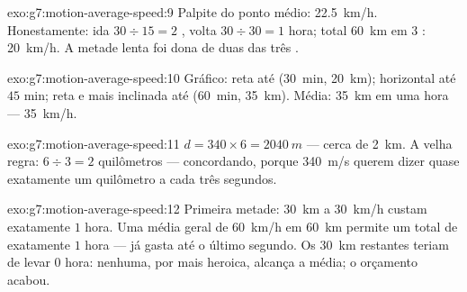 \begin{solution}{exo:g7:motion-average-speed:9}
Palpite do ponto médio: \qty{22.5}{km/h}. Honestamente: ida
$30 \div 15 = 2$ , volta $30 \div 30 = 1$ hora; total
\qty{60}{km} em $3$ : \qty{20}{km/h}. A metade lenta foi dona de
duas das três .
\end{solution}

\begin{solution}{exo:g7:motion-average-speed:10}
Gráfico: reta até (\qty{30}{min}, \qty{20}{km}); horizontal até $45$
min; reta e mais inclinada até (\qty{60}{min}, \qty{35}{km}). Média:
\qty{35}{km} em uma hora --- \qty{35}{km/h}.
\end{solution}

\begin{solution}{exo:g7:motion-average-speed:11}
$d = 340 \times 6 = \qty{2040}{m}$ --- cerca de \qty{2}{km}. A velha
regra: $6 \div 3 = 2$ quilômetros --- concordando, porque
\qty{340}{m/s} querem dizer quase exatamente um quilômetro a cada
três segundos.
\end{solution}

\begin{solution}{exo:g7:motion-average-speed:12}
Primeira metade: \qty{30}{km} a \qty{30}{km/h} custam exatamente $1$
hora. Uma média geral de \qty{60}{km/h} em \qty{60}{km} permite um
total de exatamente $1$ hora --- já gasta até o último segundo. Os
\qty{30}{km} restantes teriam de levar $0$ hora:  nenhuma,
por mais heroica, alcança a média; o orçamento acabou.
\end{solution}

